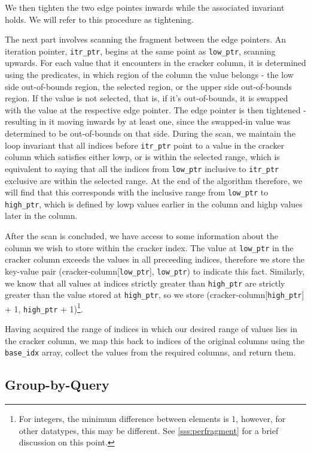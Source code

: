 We then tighten the two edge pointes inwards while the associated invariant holds. We will refer to
this procedure as tightening.

The next part involves scanning the fragment between the edge pointers. An iteration pointer,
\texttt{itr\_ptr}, begins at the same point as \texttt{low\_ptr}, scanning upwards. For each value that it encounters in the cracker column, it is determined using the predicates, in which region of
the column the value belongs - the low side out-of-bounds region, the selected region, or the upper
side out-of-bounds region. If the value is not selected, that is, if it's out-of-bounds, it is swapped
with the value at the respective edge pointer. The edge pointer is then tightened - resulting in it
moving inwards by at least one, since the swapped-in value was determined to be out-of-bounds on that
side. During the scan, we maintain the loop invariant that all indices before \texttt{itr\_ptr} point
to a value in the cracker column which satisfies either lowp, or is within the selected range, which
is equivalent to saying that all the indices from \texttt{low\_ptr} inclusive to \texttt{itr\_ptr}
exclusive are within the selected range. At the end of the algorithm therefore, we will find that
this corresponds with the inclusive range from \texttt{low\_ptr} to \texttt{high\_ptr}, which is
defined by lowp values earlier in the column and highp values later in the column.

After the scan is concluded, we have access to some information about the column we wish to store
within the cracker index. The value at \texttt{low\_ptr} in the cracker column exceeds the values in all preceeding indices, therefore we store the key-value pair (cracker-column[\texttt{low\_ptr}],
\texttt{low\_ptr}) to indicate this fact. Similarly, we know that all values at indices strictly greater than \texttt{high\_ptr} are strictly greater than the value stored at \texttt{high\_ptr}, so
we store (cracker-column[\texttt{high\_ptr}] + 1, \texttt{high\_ptr} + 1)\footnote{For integers, the
minimum difference between elements is 1, however, for other datatypes, this may be different. See
\ref{sss:perfragment} for a brief discussion on this point.}.

Having acquired the range of indices in which our desired range of values lies in the cracker column,
we map this back to indices of the original columns using the \texttt{base\_idx} array, collect the
values from the required columns, and return them.

\subsection{Group-by-Query}

